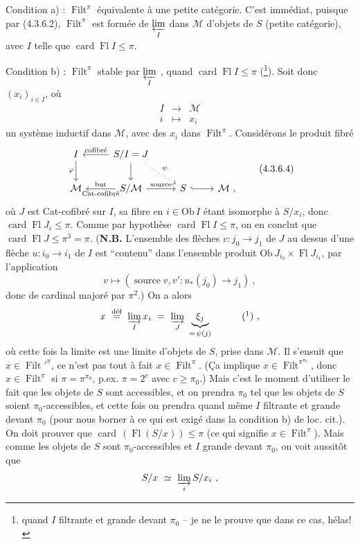 \documentclass[11pt]{article}
\newcommand{\printedpage}[1]{\if\relax\detokenize{#1}\relax\else\marginpar{\footnotesize p.~#1}\fi}
\newcommand{\msp}[1]{\marginpar{\footnotesize [#1]}}
\newcommand{\Ob}{\mathrm{Ob}\,}
\newcommand{\card}{\operatorname{card}}
\newcommand{\Fl}{\operatorname{Fl}}
\newcommand{\Filt}{\operatorname{Filt}}
\begin{document}
\printedpage{13}

\noindent\msp{page 74}Condition a) : $\Filt^\pi$ équivalente à une petite catégorie. C'est immédiat, puisque par (4.3.6.2), $\Filt^\pi$ est formée de $\varprojlim\limits_I$ dans $\mathcal M$ d'objets de $S$ (petite catégorie), avec $I$ telle que $\card\Fl I\leqslant\pi$.

\noindent Condition b) : $\Filt^\pi$ stable par $\varprojlim\limits_I$ , quand $\card\Fl I\leqslant\pi$ (\footnote{quand $I$ filtrante et grande devant $\pi_0$ -- je ne le prouve que dans ce cas, hélas!}). Soit donc $(x_i)_{i\in I}$, où
\[
\begin{array}{ccc}
I & \longrightarrow & \mathcal M\\[1ex]
i & \longmapsto & x_i
\end{array}
\]
un système inductif dans $\mathcal M$, avec des $x_i$ dans $\Filt^\pi$. Considérons le produit fibré
\[
\begin{tikzcd}
I \arrow[d, "\varphi"'] & S/I = J \arrow[l, "\text{cofibré}"'] \arrow[d] \arrow[dr, dotted, "\psi"] & & \\
\mathcal M & S/\mathcal M \arrow[l, "\text{but}"', "\text{Cat-cofibré}"] \arrow[r, "\text{source}"] & S \arrow[r, hook] & \mathcal M\ ,
\end{tikzcd}
\tag*{(4.3.6.4)}
\]
où $J$ est Cat-cofibré sur $I$, sa fibre en $i\in\Ob I$ étant isomorphe à $S/x_i$, donc $\card\Fl J_i\leqslant\pi$. Comme par hypothèse $\card\Fl I\leqslant\pi$, on en conclut que $\card\Fl J\leqslant\pi^3=\pi$. (\textbf{N.B.} L'ensemble des flèches $v:j_0\longrightarrow j_1$ de $J$ au dessus d'une flèche $u:i_0\longrightarrow i_1$ de $I$ est “contenu” dans l'ensemble produit $\Ob J_{i_0}\times\Fl J_{i_1}$, par l'application
\[
v\longmapsto(\operatorname{source}v,v':u_*(j_0)\longrightarrow j_1)\ ,
\]
donc de cardinal majoré par $\pi^2$.) On \msp{page 75}a alors
\[
x\ \overset{\text{déf}}{=}\ \varinjlim_I x_i\ =\ \varinjlim_J\ \underbrace{\xi_j}_{=\,\psi(j)}\qquad\quad\mbox{(\footnotemark)}\ ,
\]
%
où cette fois la limite est une limite d'objets de $S$, prise dans $\mathcal M$. Il s'ensuit que $x\in\Filt'^{\pi}$, ce n'est pas tout à fait $x\in\Filt^\pi$. (Ça implique $x\in\Filt^{\pi^{\pi_0}}$, donc $x\in\Filt^\pi$ si $\pi=\pi^{\pi_0}$, p.ex. $\pi=2^c$ avec $c\geqslant\pi_0$.) Mais c'est le moment d'utiliser le fait que les objets de $S$ sont accessibles, et on prendra $\pi_0$ tel que les objets de $S$ soient $\pi_0$-accessibles, et cette fois on prendra quand même $I$ filtrante et grande devant $\pi_0$ (pour nous borner à ce qui est exigé dans la condition b) de loc. cit.). On doit prouver que $\card\,(\Fl(S/x))\leqslant\pi$ (ce qui signifie $x\in\Filt^\pi$). Mais comme les objets de $S$ sont $\pi_0$-accessibles et $I$ grande devant $\pi_0$, on voit aussitôt que
\[
S/x\ \simeq\ \varinjlim_i S/x_i\ ,
\]
\end{document}
